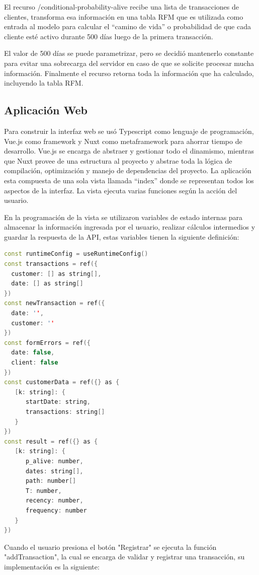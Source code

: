 	El recurso /conditional-probability-alive recibe una lista de transacciones de clientes, transforma esa información en una tabla RFM que es utilizada como entrada al modelo para calcular el “camino de vida” o probabilidad de que cada cliente esté activo durante 500 días luego de la primera transacción.

	El valor de 500 días se puede parametrizar, pero se decidió mantenerlo constante para evitar una sobrecarga del servidor en caso de que se solicite procesar mucha información. Finalmente el recurso retorna toda la información que ha calculado, incluyendo la tabla RFM.
	
\subsection{Aplicación Web}

Para construir la interfaz web se usó Typescript como lenguaje de programación, Vue.js como framework y Nuxt como metaframework para ahorrar tiempo de desarrollo. Vue.js se encarga de abstraer y gestionar todo el dinamismo, mientras que Nuxt provee de una estructura al proyecto y abstrae toda la lógica de compilación, optimización y manejo de dependencias del proyecto. La aplicación esta compuesta de una sola vista llamada “index” donde se representan todos los aspectos de la interfaz. La vista ejecuta varias funciones según la acción del usuario. 

En la programación de la vista se utilizaron variables de estado internas para almacenar la información ingresada por el usuario, realizar cálculos intermedios y guardar la respuesta de la API, estas variables tienen la siguiente definición:

\begin{lstlisting}[language=C++, caption=script en index.vue]
const runtimeConfig = useRuntimeConfig()
const transactions = ref({
  customer: [] as string[],
  date: [] as string[]
})
const newTransaction = ref({
  date: '',
  customer: ''
})
const formErrors = ref({
  date: false,
  client: false
})
const customerData = ref({} as {
   [k: string]: {
      startDate: string,
      transactions: string[]
   }
})
const result = ref({} as {
   [k: string]: {
      p_alive: number,
      dates: string[],
      path: number[]
      T: number,
      recency: number,
      frequency: number
   }
})
\end{lstlisting}	

Cuando el usuario presiona el botón "Registrar" se ejecuta la función "addTransaction", la cual se encarga de validar y registrar una transacción, su implementación es la siguiente:

